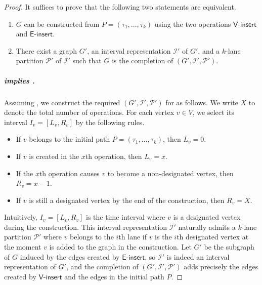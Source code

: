 \documentclass[11pt]{article}
\theoremstyle{definition}
\theoremstyle{remark}
\newcommand{\insv}{\mathsf{V}\text{-}\mathsf{insert}}
\newcommand{\inse}{\mathsf{E}\text{-}\mathsf{insert}}
\begin{document}
\begin{proof}
It suffices to prove that the following two statements are equivalent.
\begin{enumerate}
    \item \label{item1} $G$ can be constructed from $P = (\tau_1, \ldots, \tau_k)$ using the two operations $\insv$ and $\inse$. 
    \item\label{item2} There exist a graph $G'$, an interval representation $\mathcal{I}'$ of $G'$, and a $k$-lane partition $\mathcal{P}'$ of $\mathcal{I}'$ such that $G$ is the completion of $(G', \mathcal{I}', \mathcal{P}')$.
\end{enumerate}

\subparagraph{ implies .} Assuming , we construct the required $(G', \mathcal{I}', \mathcal{P}')$ for  as follows. We write $X$ to denote the total number of operations.
For each vertex $v \in V$, we select its interval $I_v=[L_v, R_v]$ by the following rules.
\begin{itemize}
   \item If $v$ belongs to the initial path $P = (\tau_1, \ldots, \tau_k)$, then $L_v = 0$.
    \item If $v$ is created in the $x$th operation, then $L_v = x$.
    \item If the $x$th operation causes $v$ to become a non-designated vertex, then $R_v = x-1$.
    \item If $v$ is still a designated vertex by the end of the construction, then $R_v = X$.
\end{itemize}
Intuitively, $I_v=[L_v, R_v]$ is the time interval where $v$ is a designated vertex during the construction.
This interval representation $\mathcal{I}'$ naturally admits a $k$-lane partition $\mathcal{P}'$ where $v$ belongs to the $i$th lane if $v$ is the $i$th designated vertex at the moment $v$ is added to the graph in the construction.
Let $G'$ be the subgraph of $G$ induced by the edges created by $\inse$, so  $\mathcal{I}'$ is indeed an interval representation of $G'$, and the completion of $(G', \mathcal{I}', \mathcal{P}')$ adds precisely the edges created by $\insv$ and the edges in the initial path $P$.


\end{proof}
\end{document}
